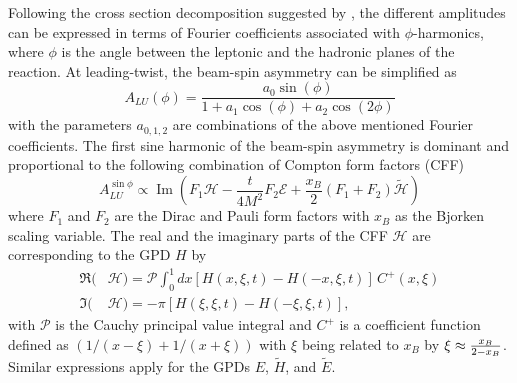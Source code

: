 \documentclass[twocolumn,nofootinbib,showpacs,prl,superscriptaddress,secnumarabic,amssymb,nobibnotes,aps,floatfix]{revtex4}
\begin{document}
Following the cross section decomposition suggested by \cite{Belitsky:2001ns}, 
the different amplitudes can be expressed in terms of Fourier coefficients 
associated with $\phi$-harmonics, where $\phi$ is the angle between the 
leptonic and the hadronic planes of the reaction. At leading-twist, the 
beam-spin asymmetry can be simplified as \begin{equation}
   A_{LU}(\phi) = \frac{a_{0}\sin(\phi)}{1+a_{1}\cos(\phi)+a_{2}\cos(2\phi)}
   \label{eq:alu-simp}
\end{equation}
with the parameters $a_{0,1,2}$ are combinations of the above mentioned Fourier 
coefficients. The first sine harmonic of the beam-spin asymmetry is dominant 
and proportional to the following combination of Compton form factors (CFF) 
\cite{Guidal:2013rya}
\begin{equation}
   A_{LU}^{\sin\phi} \propto \operatorname{Im}( F_1 \mathcal{H}- \frac{t}{4M^2} 
   F_2 \mathcal{E}+ \frac{x_B}{2}(F_1+F_2)\tilde{\mathcal{H}})
\end{equation}
where $F_1$ and $F_2$ are the Dirac and Pauli form factors with $x_B$ as the 
Bjorken scaling variable. The real and the imaginary parts of the CFF 
$\mathcal{H}$ are corresponding to the GPD $H$ by  \begin{align}
   \Re(&\mathcal{H}) = \mathcal{P} \int_{0}^{1}dx[H(x,\xi,t)-H(-x,\xi,t)] \, 
   C^{+}(x,\xi) \\
   \Im(&\mathcal{H}) = - \pi [H(\xi,\xi,t)-H(-\xi,\xi,t)],
\end{align}
with $\mathcal{P}$ is the Cauchy principal value integral and $C^{+}$ is a 
coefficient function defined as $(1/(x-\xi) + 1/(x+\xi))$ with $\xi$ being 
related to $x_B$ by $\xi\approx {{x_B}\over{2-x_B}}$. Similar expressions apply 
for the GPDs $E$, $\widetilde{H}$, and $\widetilde{E}$.

\end{document}
